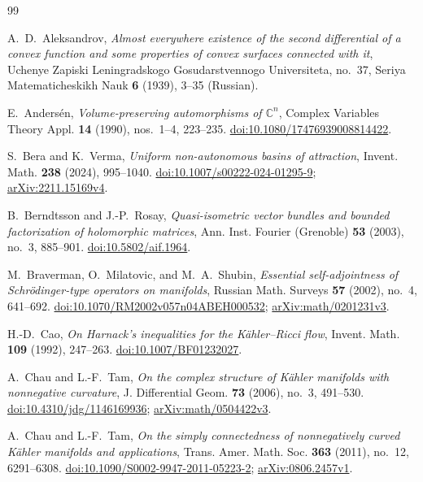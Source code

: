 \begin{thebibliography}{99}

A.~D.~Aleksandrov,
\emph{Almost everywhere existence of the second differential of a convex
function and some properties of convex surfaces connected with it},
Uchenye Zapiski Leningradskogo Gosudarstvennogo Universiteta,
no.~37, Seriya Matematicheskikh Nauk \textbf{6} (1939), 3--35 (Russian).

E.~Anders\'en,
\emph{Volume-preserving automorphisms of $\mathbb C^n$},
Complex Variables Theory Appl. \textbf{14} (1990), nos.~1--4, 223--235.
\href{https://doi.org/10.1080/17476939008814422}
{doi:10.1080/17476939008814422}.

S.~Bera and K.~Verma,
\emph{Uniform non-autonomous basins of attraction},
Invent. Math. \textbf{238} (2024), 995--1040.
\href{https://doi.org/10.1007/s00222-024-01295-9}
{doi:10.1007/s00222-024-01295-9};
\href{https://arxiv.org/abs/2211.15169v4}{arXiv:2211.15169v4}.

B.~Berndtsson and J.-P.~Rosay,
\emph{Quasi-isometric vector bundles and bounded factorization of
holomorphic matrices},
Ann. Inst. Fourier (Grenoble) \textbf{53} (2003), no.~3, 885--901.
\href{https://doi.org/10.5802/aif.1964}{doi:10.5802/aif.1964}.

M.~Braverman, O.~Milatovic, and M.~A.~Shubin,
\emph{Essential self-adjointness of Schr\"odinger-type operators on manifolds},
Russian Math. Surveys \textbf{57} (2002), no.~4, 641--692.
\href{https://doi.org/10.1070/RM2002v057n04ABEH000532}
{doi:10.1070/RM2002v057n04ABEH000532};
\href{https://arxiv.org/abs/math/0201231v3}{arXiv:math/0201231v3}.

H.-D.~Cao,
\emph{On Harnack's inequalities for the K\"ahler--Ricci flow},
Invent. Math. \textbf{109} (1992), 247--263.
\href{https://doi.org/10.1007/BF01232027}{doi:10.1007/BF01232027}.

A.~Chau and L.-F.~Tam,
\emph{On the complex structure of K\"ahler manifolds with nonnegative curvature},
J. Differential Geom. \textbf{73} (2006), no.~3, 491--530.
\href{https://doi.org/10.4310/jdg/1146169936}{doi:10.4310/jdg/1146169936};
\href{https://arxiv.org/abs/math/0504422v3}{arXiv:math/0504422v3}.

A.~Chau and L.-F.~Tam,
\emph{On the simply connectedness of nonnegatively curved
K\"ahler manifolds and applications},
Trans. Amer. Math. Soc. \textbf{363} (2011), no.~12, 6291--6308.
\href{https://doi.org/10.1090/S0002-9947-2011-05223-2}
{doi:10.1090/S0002-9947-2011-05223-2};
\href{https://arxiv.org/abs/0806.2457v1}{arXiv:0806.2457v1}.


\end{thebibliography}

